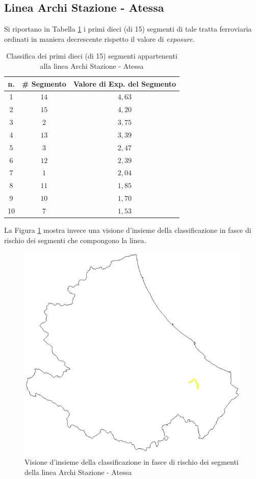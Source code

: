 \subsection{Linea Archi Stazione - Atessa}
Si riportano in Tabella \ref{classificaarchiatessa} i primi dieci (di 15) segmenti di tale tratta ferroviaria ordinati in maniera decrescente rispetto il valore di \textit{exposure}.
\begin{table}[hpt]
\centering
\begin{tabular}{|c|c|c|}
\hline
\rowcolor{lightgray}
n. & \# Segmento & Valore di Exp. del Segmento \\ \hline \rowcolor{icterine}
1  & $14$        & $4,63$                      \\ \hline \rowcolor{icterine}
2  & $15$        & $4,20$                      \\ \hline \rowcolor{icterine}
3  & $2$        & $3,75$                      \\ \hline \rowcolor{icterine}
4  & $13$        & $3,39$                      \\ \hline \rowcolor{icterine}
5  & $3$        & $2,47$                      \\ \hline \rowcolor{icterine}
6  & $12$        & $2,39$                      \\ \hline \rowcolor{icterine}
7  & $1$       & $2,04$                      \\ \hline \rowcolor{icterine}
8  & $11$        & $1,85$                      \\ \hline \rowcolor{icterine}
9  & $10$        & $1,70$                      \\ \hline \rowcolor{icterine}
10 & $7$        & $1,53$                      \\ \hline
\end{tabular}
\caption{Classifica dei primi dieci (di 15) segmenti appartenenti alla linea Archi Stazione - Atessa}
\label{classificaarchiatessa}
\end{table}
\newline
La Figura \ref{archiatessa} mostra invece una visione d'insieme della classificazione in fasce di rischio dei segmenti che compongono la linea.
\begin{figure}[hpt]
\centering
\includegraphics[width=0.4\linewidth]{img/archiatessa.jpeg}
\caption{Visione d'insieme della classificazione in fasce di rischio dei segmenti della linea Archi Stazione - Atessa}
\label{archiatessa}
\end{figure}
